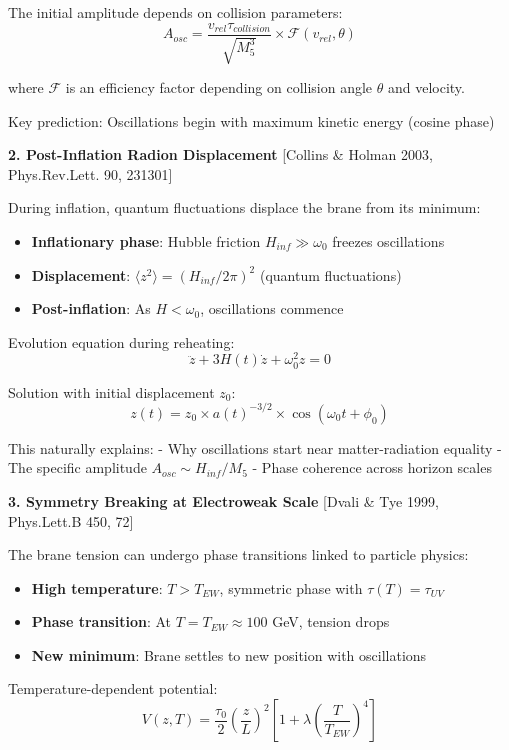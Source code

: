\documentclass[
  11pt,
]{report}
\providecommand{\tightlist}{%
  \setlength{\itemsep}{0pt}\setlength{\parskip}{0pt}}
\begin{document}
The initial amplitude depends on collision parameters:
\[A_{osc} = \frac{v_{rel} \tau_{collision}}{\sqrt{M_5^3}} \times \mathcal{F}(v_{rel}, \theta)\]

where \(\mathcal{F}\) is an efficiency factor depending on collision
angle \(\theta\) and velocity.

Key prediction: Oscillations begin with maximum kinetic energy (cosine
phase)

\textbf{2. Post-Inflation Radion Displacement} {[}Collins \& Holman
2003, Phys.Rev.Lett. 90, 231301{]}

During inflation, quantum fluctuations displace the brane from its
minimum:

\begin{itemize}
\tightlist
\item
  \textbf{Inflationary phase}: Hubble friction \(H_{inf} \gg \omega_0\)
  freezes oscillations
\item
  \textbf{Displacement}: \(\langle z^2 \rangle = (H_{inf}/2\pi)^2\)
  (quantum fluctuations)
\item
  \textbf{Post-inflation}: As \(H < \omega_0\), oscillations commence
\end{itemize}

Evolution equation during reheating:
\[\ddot{z} + 3H(t)\dot{z} + \omega_0^2 z = 0\]

Solution with initial displacement \(z_0\):
\[z(t) = z_0 \times a(t)^{-3/2} \times \cos(\omega_0 t + \phi_0)\]

This naturally explains: - Why oscillations start near matter-radiation
equality - The specific amplitude \(A_{osc} \sim H_{inf}/M_5\) - Phase
coherence across horizon scales

\textbf{3. Symmetry Breaking at Electroweak Scale} {[}Dvali \& Tye 1999,
Phys.Lett.B 450, 72{]}

The brane tension can undergo phase transitions linked to particle
physics:

\begin{itemize}
\tightlist
\item
  \textbf{High temperature}: \(T > T_{EW}\), symmetric phase with
  \(\tau(T) = \tau_{UV}\)
\item
  \textbf{Phase transition}: At \(T = T_{EW} \approx 100\) GeV, tension
  drops
\item
  \textbf{New minimum}: Brane settles to new position with oscillations
\end{itemize}

Temperature-dependent potential:
\[V(z,T) = \frac{\tau_0}{2}\left(\frac{z}{L}\right)^2 \left[1 + \lambda\left(\frac{T}{T_{EW}}\right)^4\right]\]
\end{document}
